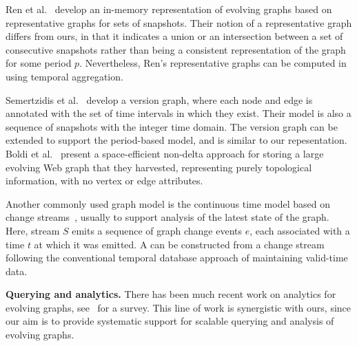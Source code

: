 Ren et al.~\cite{Ren2011} develop an in-memory representation of
evolving graphs based on representative graphs for sets of snapshots.
Their notion of a representative graph differs from ours, in that 
it indicates a union or an intersection between a set
of consecutive snapshots rather than being a consistent
representation of the graph for some period $p$.  Nevertheless, Ren's
representative graphs can be computed in \ql using temporal
aggregation.

Semertzidis et al.~\cite{Semertzidis2015} develop a version graph,
where each node and edge is annotated with the set of time intervals
in which they exist.  Their model is also a sequence of snapshots with
the integer time domain.  The version graph can be extended to support
the period-based model, and is similar to our \og 
repesentation.
%
Boldi et al.~\cite{Boldi2008} present a space-efficient non-delta
approach for storing a large evolving Web graph that they harvested,
representing purely topological information, with no vertex or edge
attributes.

Another commonly used graph model is the continuous time model based
on change streams~\cite{Cheng2012,Ediger2012}, usually to support
analysis of the latest state of the graph.  Here, stream $S$ emits a
sequence of graph change events $e$, each associated with a time $t$
at which it was emitted. A \tg can be constructed from a change stream following the
conventional temporal database approach of maintaining valid-time
data.


{\bf Querying and analytics.} There has been much recent work on
analytics for evolving graphs,
see~\cite{DBLP:journals/csur/AggarwalS14} for a survey. This line of
work is synergistic with ours, since our aim is to provide systematic
support for scalable querying and analysis of evolving graphs.

